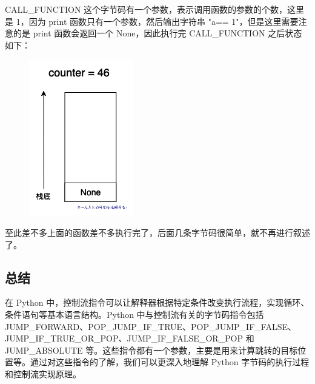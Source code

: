 CALL\_FUNCTION 这个字节码有一个参数，表示调用函数的参数的个数，这里是 1，因为 print 函数只有一个参数，然后输出字符串 "a== 1"，但是这里需要注意的是 print 函数会返回一个 None，因此执行完 CALL\_FUNCTION 之后状态如下：

    \begin{figure}[H]
        \centering
            \includegraphics[scale=.25]{images/65-bytecode.png}
						\caption{ }
        \label{fig:my_label}
    \end{figure}
    
至此差不多上面的函数差不多执行完了，后面几条字节码很简单，就不再进行叙述了。
\subsection{总结}
在 Python 中，控制流指令可以让解释器根据特定条件改变执行流程，实现循环、条件语句等基本语言结构。Python 中与控制流有关的字节码指令包括 JUMP\_FORWARD、POP\_JUMP\_IF\_TRUE、POP\_JUMP\_IF\_FALSE、JUMP\_IF\_TRUE\_OR\_POP、JUMP\_IF\_FALSE\_OR\_POP 和 JUMP\_ABSOLUTE 等。这些指令都有一个参数，主要是用来计算跳转的目标位置等。通过对这些指令的了解，我们可以更深入地理解 Python 字节码的执行过程和控制流实现原理。

